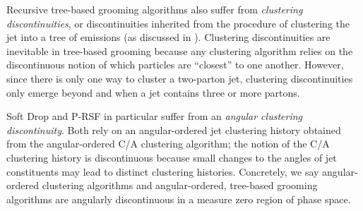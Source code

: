 Recursive tree-based grooming algorithms also suffer from \textit{clustering discontinuities}, or discontinuities inherited from the procedure of clustering the jet into a tree of emissions (as discussed in ).
%
Clustering discontinuities are inevitable in tree-based grooming because any clustering algorithm relies on the discontinuous notion of which particles are ``closest'' to one another.
%
However, since there is only one way to cluster a two-parton jet, clustering discontinuities only emerge beyond  and when a jet contains three or more partons.

Soft Drop and P-RSF in particular suffer from an \textit{angular clustering discontinuity}.
%
Both rely on an angular-ordered jet clustering history obtained from the angular-ordered C/A clustering algorithm;
%
the notion of the C/A clustering history is discontinuous because small changes to the angles of jet constituents may lead to distinct clustering histories.
%
Concretely, we say angular-ordered clustering algorithms and angular-ordered, tree-based grooming algorithms are angularly discontinuous in a measure zero region of phase space.

